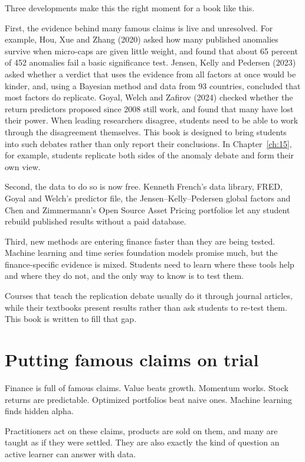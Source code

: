 Three developments make this the right moment for a book like this.

First, the evidence behind many famous claims is live and unresolved. For example, Hou, Xue and Zhang (2020) asked how many published anomalies survive when micro-caps are given little weight, and found that about 65 percent of 452 anomalies fail a basic significance test. Jensen, Kelly and Pedersen (2023) asked whether a verdict that uses the evidence from all factors at once would be kinder, and, using a Bayesian method and data from 93 countries, concluded that most factors do replicate. Goyal, Welch and Zafirov (2024) checked whether the return predictors proposed since 2008 still work, and found that many have lost their power. When leading researchers disagree, students need to be able to work through the disagreement themselves. This book is designed to bring students into such debates rather than only report their conclusions. In Chapter~\ref{ch:15}, for example, students replicate both sides of the anomaly debate and form their own view.

Second, the data to do so is now free. Kenneth French's data library, FRED, Goyal and Welch's predictor file, the Jensen--Kelly--Pedersen global factors and Chen and Zimmermann's Open Source Asset Pricing portfolios let any student rebuild published results without a paid database.

Third, new methods are entering finance faster than they are being tested. Machine learning and time series foundation models promise much, but the finance-specific evidence is mixed. Students need to learn where these tools help and where they do not, and the only way to know is to test them.

Courses that teach the replication debate usually do it through journal articles, while their textbooks present results rather than ask students to re-test them. This book is written to fill that gap.

\section*{Putting famous claims on trial}

Finance is full of famous claims. Value beats growth. Momentum works. Stock returns are predictable. Optimized portfolios beat naive ones. Machine learning finds hidden alpha.

Practitioners act on these claims, products are sold on them, and many are taught as if they were settled. They are also exactly the kind of question an active learner can answer with data.

